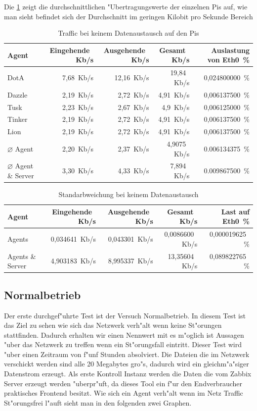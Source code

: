 Die \cref{tab:noTraffic} zeigt die durchschnittlichen "Ubertragungswerte der einzelnen Pis auf, wie man sieht
befindet sich der Durchschnitt im geringen Kilobit pro Sekunde Bereich 

\begin{table}
\centering
\begin{tabular}{l%
 r<{\,Kb/s}%
 r<{\,Kb/s}%
 r<{\,Kb/s}%
 r<{\,\%}%
}
Agent	  			& Eingehende		& Ausgehende		& Gesamt		& Auslastung von Eth0	\\
\hline
DotA				& 7,68			& 12,16			& 19,84			& 0,024800000 		\\
Dazzle 				& 2,19	 		& 2,72			& 4,91			& 0,006137500 		\\
Tusk 				& 2,23			& 2,67			& 4,9			& 0,006125000		\\
Tinker				& 2,19	 		& 2,72	 		& 4,91	 		& 0,006137500		\\
Lion				& 2,19	 		& 2,72	 		& 4,91  		& 0,006137500		\\
$\diameter $ Agent 		& 2,20			& 2,37			& 4,9075		& 0.006134375		\\   
$\diameter $ Agent \& Server 	& 3,30  		& 4,33			& 7,894			& 0.009867500		\\
\end{tabular}
\caption{Traffic bei keinem Datenaustausch auf den Pis}
\label{tab:noTraffic}
\end{table}

\begin{table}
\centering
\begin{tabular}{l%
 r<{\,Kb/s}%
 r<{\,Kb/s}%
 r<{\,Kb/s}%
 r<{\,\%}%
}
Agent		& Eingehende            & Ausgehende            & Gesamt                & Last auf Eth0 \\
\hline
Agents		& 0,034641              & 0,043301              & 0,0086600             & 0,000019625  \\
Agents \& Server& 4,903183 		& 8,995337        	& 13,35604            	& 0,089822765        \\
\end{tabular}
\caption{Standarbweichung bei keinem Datenaustausch}
\label{tab:standardTrafficAbweichung}
\end{table}


\subsection{Normalbetrieb}
\label{subsec:normalbetrieb}
Der erste durchgef"uhrte Test ist der Versuch Normalbetrieb. In diesem Test ist das Ziel zu sehen wie %
sich das Netzwerk verh"alt wenn keine St"orungen stattfinden. Dadurch erhalten wir einen Nennwert mit es m"oglich ist %
Aussagen "uber das Netzwerk zu treffen wenn ein St"orungsfall eintritt. Dieser Test wird "uber einen Zeitraum von f"unf %
Stunden absolviert. Die Dateien die im Netzwerk verschickt werden sind alle 20 Megabytes gro"s, dadurch wird ein %
gleichm"a"siger Datenstrom erzeugt. Als erste Kontroll Instanz werden die Daten die vom Zabbix Server erzeugt werden %
"uberpr"uft, da dieses Tool ein f"ur den Endverbraucher praktisches Frontend besitzt. Wie sich ein Agent verh"alt %
wenn im Netz Traffic St"orungsfrei l"auft sieht man in den folgenden zwei Graphen.

